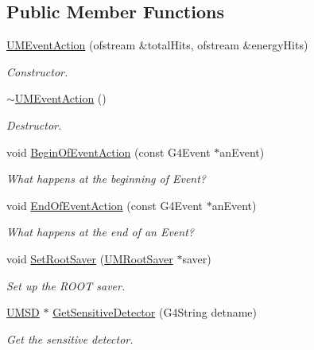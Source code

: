 \subsection*{Public Member Functions}
\begin{DoxyCompactItemize}
\item 
\hyperlink{classUMEventAction_a81e4b6ebea6a9c34692964c08bd1a7c8}{U\+M\+Event\+Action} (ofstream \&total\+Hits, ofstream \&energy\+Hits)
\begin{DoxyCompactList}\small\item\em Constructor. \end{DoxyCompactList}\item 
\hyperlink{classUMEventAction_a503b6634cb64db87aea320d1c8810692}{$\sim$\+U\+M\+Event\+Action} ()
\begin{DoxyCompactList}\small\item\em Destructor. \end{DoxyCompactList}\item 
void \hyperlink{classUMEventAction_af1288b6bdbdfbe40a9fafc13b84250db}{Begin\+Of\+Event\+Action} (const G4\+Event $\ast$an\+Event)
\begin{DoxyCompactList}\small\item\em What happens at the beginning of Event? \end{DoxyCompactList}\item 
void \hyperlink{classUMEventAction_ab31f064263770cd6f2daeca58ac160ee}{End\+Of\+Event\+Action} (const G4\+Event $\ast$an\+Event)
\begin{DoxyCompactList}\small\item\em What happens at the end of an Event? \end{DoxyCompactList}\item 
void \hyperlink{classUMEventAction_a5f4b755e2e7b9c61ed355b6e21dd93e0}{Set\+Root\+Saver} (\hyperlink{classUMRootSaver}{U\+M\+Root\+Saver} $\ast$saver)
\begin{DoxyCompactList}\small\item\em Set up the R\+O\+O\+T saver. \end{DoxyCompactList}\item 
\hyperlink{classUMSD}{U\+M\+S\+D} $\ast$ \hyperlink{classUMEventAction_a8748655e8f5afe57a0c7ed6e83038ee0}{Get\+Sensitive\+Detector} (G4\+String detname)
\begin{DoxyCompactList}\small\item\em Get the sensitive detector. \end{DoxyCompactList}\end{DoxyCompactItemize}
